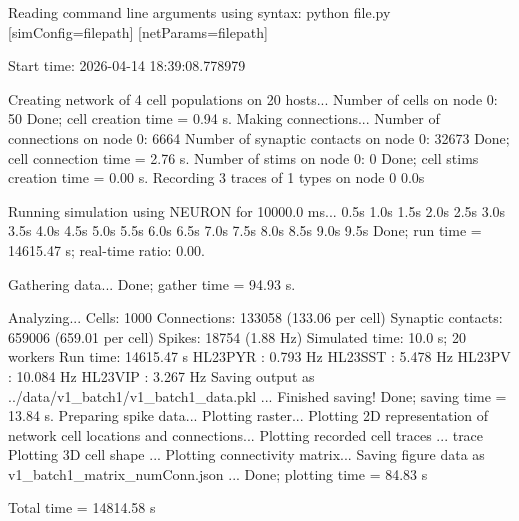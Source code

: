 Reading command line arguments using syntax: python file.py [simConfig=filepath] [netParams=filepath]

Start time:  2026-04-14 18:39:08.778979

Creating network of 4 cell populations on 20 hosts...
  Number of cells on node 0: 50 
  Done; cell creation time = 0.94 s.
Making connections...
  Number of connections on node 0: 6664 
  Number of synaptic contacts on node 0: 32673 
  Done; cell connection time = 2.76 s.
  Number of stims on node 0: 0 
  Done; cell stims creation time = 0.00 s.
Recording 3 traces of 1 types on node 0
0.0s

Running simulation using NEURON for 10000.0 ms...
0.5s
1.0s
1.5s
2.0s
2.5s
3.0s
3.5s
4.0s
4.5s
5.0s
5.5s
6.0s
6.5s
7.0s
7.5s
8.0s
8.5s
9.0s
9.5s
  Done; run time = 14615.47 s; real-time ratio: 0.00.

Gathering data...
  Done; gather time = 94.93 s.

Analyzing...
  Cells: 1000
  Connections: 133058 (133.06 per cell)
  Synaptic contacts: 659006 (659.01 per cell)
  Spikes: 18754 (1.88 Hz)
  Simulated time: 10.0 s; 20 workers
  Run time: 14615.47 s
   HL23PYR : 0.793 Hz
   HL23SST : 5.478 Hz
   HL23PV : 10.084 Hz
   HL23VIP : 3.267 Hz
Saving output as ../data/v1_batch1/v1_batch1_data.pkl ... 
Finished saving!
  Done; saving time = 13.84 s.
Preparing spike data...
Plotting raster...
Plotting 2D representation of network cell locations and connections...
Plotting recorded cell traces ... trace
Plotting 3D cell shape ...
Plotting connectivity matrix...
Saving figure data as v1_batch1_matrix_numConn.json ... 
  Done; plotting time = 84.83 s

Total time = 14814.58 s

